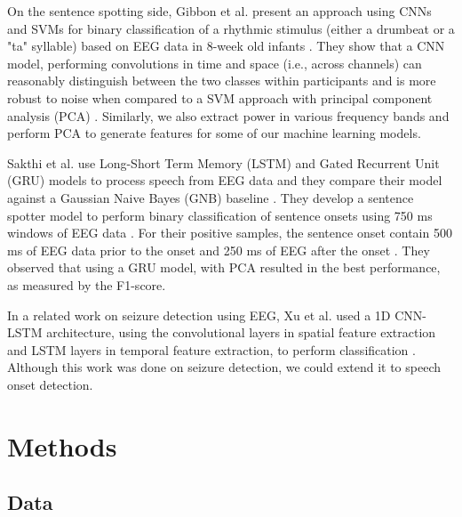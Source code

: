 \documentclass[format=sigconf, nonacm=true, review=false, screen=true]{acmart}
\begin{document}
On the sentence spotting side, Gibbon et al. present an approach using CNNs and SVMs for binary classification of a rhythmic stimulus (either a drumbeat or a "ta" syllable) based on EEG data in 8-week old infants \cite{gibbon2021machine}. They show that a CNN model, performing convolutions in time and space (i.e., across channels) can reasonably distinguish between the two classes within participants and is more robust to noise when compared to a SVM approach with principal component analysis (PCA) \cite{gibbon2021machine}. Similarly, we also extract power in various frequency bands and perform PCA to generate features for some of our machine learning models.

Sakthi et al. use Long-Short Term Memory (LSTM) and Gated Recurrent Unit (GRU) models to process speech from EEG data and they compare their model against a Gaussian Naive Bayes (GNB) baseline \cite{sakthi2021keyword}. They develop a sentence spotter model to perform binary classification of sentence onsets using 750 ms windows of EEG data \cite{sakthi2021keyword}. For their positive samples, the sentence onset contain 500 ms of EEG data prior to the onset and 250 ms of EEG after the onset \cite{sakthi2021keyword}. They observed that using a GRU model, with PCA resulted in the best performance, as measured by the F1-score.


 In a related work on seizure detection using EEG, Xu et al. used a 1D CNN-LSTM architecture, using the convolutional layers in spatial feature extraction and LSTM layers in temporal feature extraction, to perform classification \cite{xu2020seizure}. Although this work was done on seizure detection, we could extend it to speech onset detection.

\section{Methods}

\subsection{Data}
\end{document}

